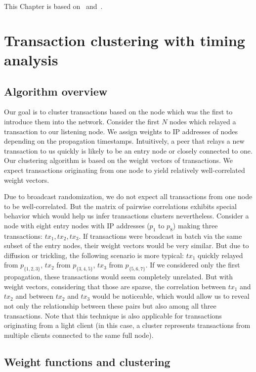 This Chapter is based on~\cite{Biryukov2019a} and~\cite{Biryukov2019b}.

\section{Transaction clustering with timing analysis}  \label{sec:Ch03Ourapproach}

\subsection{Algorithm overview}

Our goal is to cluster transactions based on the node which was the first to introduce them into the network.
Consider the first $N$ nodes which relayed a transaction to our listening node.
We assign weights to IP addresses of nodes depending on the propagation timestamps.
Intuitively, a peer that relays a new transaction to us quickly is likely to be an entry node or closely connected to one.
Our clustering algorithm is based on the weight vectors of transactions.
We expect transactions originating from one node to yield relatively well-correlated weight vectors.

Due to broadcast randomization, we do not expect all transactions from one node to be well-correlated.
But the matrix of pairwise correlations exhibits special behavior which would help us infer transactions clusters nevertheless.
Consider a node with eight entry nodes with IP addresses ($p_1$ to $p_8$) making three transactions: $tx_1, tx_2, tx_3$.
If transactions were broadcast in batch via the same subset of the entry nodes, their weight vectors would be very similar.
But due to diffusion or trickling, the following scenario is more typical: $tx_1$ quickly relayed from $p_{\{1,2,3\}}$, $tx_2$ from $p_{\{3,4,5\}}$, $tx_3$ from $p_{\{5,6,7\}}$.
If we considered only the first propagation, these transactions would seem completely unrelated.
But with weight vectors, considering that those are sparse, the correlation between $tx_1$ and $tx_2$ and between $tx_2$ and $tx_3$ would be noticeable, which would allow us to reveal not only the relationship between these pairs but also among all three transactions.
Note that this technique is also applicable for transactions originating from a light client (in this case, a cluster represents transactions from multiple clients connected to the same full node).

\subsection{Weight functions and clustering}


